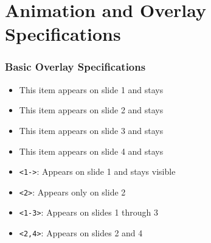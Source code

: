 \documentclass[aspectratio=169,professionalfonts]{beamer}
\begin{document}
\section{Animation and Overlay Specifications}

\begin{frame}
    \frametitle{Basic Overlay Specifications}
    
    \begin{itemize}
        \item<1-> This item appears on slide 1 and stays
        \item<2-> This item appears on slide 2 and stays
        \item<3-> This item appears on slide 3 and stays
        \item<4-> This item appears on slide 4 and stays
    \end{itemize}
    
    \begin{tcolorbox}[colback=ugmLightGrey,colframe=ugmBlue,title=Overlay Specifications]
        \begin{itemize}
            \item \texttt{<1->}: Appears on slide 1 and stays visible
            \item \texttt{<2>}: Appears only on slide 2
            \item \texttt{<1-3>}: Appears on slides 1 through 3
            \item \texttt{<2,4>}: Appears on slides 2 and 4
        \end{itemize}
    \end{tcolorbox}
\end{frame}
\end{document}

